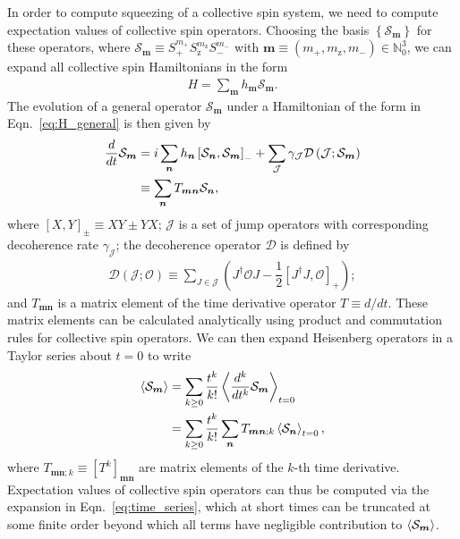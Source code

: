 \documentclass[aps,prx,superscriptaddress,twocolumn]{revtex4-2}
\newcommand{\f}[2]{\dfrac{#1}{#2}} %
\newcommand{\p}[1]{\left(#1\right)} %
\renewcommand{\sp}[1]{\left[#1\right]} %
\renewcommand{\set}[1]{\left\{#1\right\}} %
\renewcommand{\v}{\bm} %
\newcommand{\bk}{\Braket}
\newcommand{\J}{\mathcal{J}}
\renewcommand{\O}{\mathcal{O}}
\renewcommand{\S}{\mathcal{S}}
\newcommand{\z}{\text{z}}
\begin{document}
In order to compute squeezing of a collective spin system, we need to compute expectation values of collective spin operators.
Choosing the basis $\set{\S_{\v m}}$ for these operators, where $\S_{\v m}\equiv S_+^{m_+} S_\z^{m_\z} S_-^{m_-}$ with
$\v m\equiv\p{m_+,m_\z,m_-}\in\mathbb{N}_0^3$, we can expand all
collective spin Hamiltonians in the form
\begin{align}
  H = \sum_{\v m} h_{\v m} \S_{\v m}.
  \label{eq:H_general}
\end{align}
The evolution of a general operator $\S_{\v m}$ under a Hamiltonian of the form in Eqn.~\eqref{eq:H_general} is then given by
\begin{align}
  \f{d}{dt} \S_{\v m}
  &= i \sum_{\v n} h_{\v n}
  \sp{\S_{\v n}, \S_{\v m}}_-
  + \sum_\J \gamma_\J \mathcal D\p{\J; \S_{\v m}} \notag \\
  &\equiv \sum_{\v n} T_{\v m\v n} \S_{\v n},
\end{align}
where $\sp{X,Y}_\pm\equiv XY\pm YX$; $\J$ is a set of jump operators with corresponding decoherence rate $\gamma_\J$; the decoherence operator $\mathcal D$ is defined by
\begin{align}
  \mathcal{D}\p{\J;\O}
  \equiv \sum_{J\in\J}\p{J^\dag \O J - \f12\sp{J^\dag J,\O}_+};
\end{align}
and $T_{\v m\v n}$ is a matrix element of the time derivative operator $T\equiv d/dt$.
These matrix elements can be calculated analytically using product and commutation rules for collective spin operators.
We can then expand Heisenberg operators in a Taylor series about $t=0$ to write
\begin{align}
  \bk{\S_{\v m}}
  &= \sum_{k\ge0} \f{t^k}{k!} \bk{\f{d^k}{dt^k} \S_{\v m}}_{t=0}
  \notag \\
  &= \sum_{k\ge0} \f{t^k}{k!}
  \sum_{\v n} T_{\v m\v n;k} \bk{\S_{\v n}}_{t=0},
  \label{eq:time_series}
\end{align}
where $T_{\v m\v n;k}\equiv\sp{T^k}_{\v m\v n}$ are matrix elements of the $k$-th time derivative.
Expectation values of collective spin operators can thus be computed via the expansion in Eqn.~\eqref{eq:time_series}, which at short times can be truncated at some finite order beyond which all terms have negligible contribution to $\bk{\S_{\v m}}$.



\end{document}
